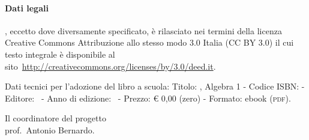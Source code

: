\paragraph{Dati legali} \serie, eccetto dove diversamente specificato, è rilasciato nei termini 
della licenza Creative Commons Attribuzione allo stesso modo 3.0 Italia
(CC BY 3.0) il cui testo integrale è disponibile al 
sito~\url{http://creativecommons.org/licenses/by/3.0/deed.it}.

Dati tecnici per l'adozione del libro a scuola: Titolo: \serie, Algebra 1 - Codice ISBN:
{\mcisbn} - Editore: \editore\ - Anno di edizione: \anno\ - Prezzo: € 0,00 (zero) - Formato:
ebook ({\scshape{pdf}}).

\begin{flushright}
Il coordinatore del progetto\\
prof.~Antonio Bernardo.
\end{flushright}

\cleardoublepage
